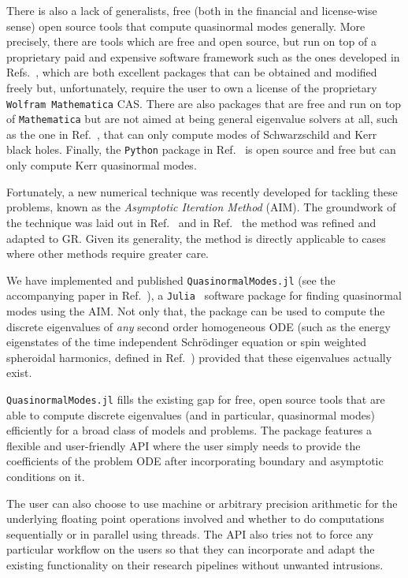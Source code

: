 There is also a lack of generalists, free (both in the financial and license-wise sense) open source tools that compute quasinormal modes generally. More precisely, there are tools which are free and open source, but run on top of a proprietary paid and expensive software framework such as the ones developed in Refs.~\cite{qnmspectral,spectralbp}, which are both excellent packages that can be obtained and modified freely but, unfortunately, require the user to own a license of the proprietary \texttt{Wolfram Mathematica} CAS. There are also packages that are free and run on top of \texttt{Mathematica} but are not aimed at being general eigenvalue solvers at all, such as the one in Ref.~\cite{bhpt_quasinormalmodes}, that can only compute modes of Schwarzschild and Kerr black holes. Finally, the \texttt{Python} package in Ref.~\cite{bhpt_qnm} is open source and free but can only compute Kerr quasinormal modes.

Fortunately, a new numerical technique was recently developed for tackling these problems, known as the \emph{Asymptotic Iteration Method} (AIM). The groundwork of the technique was laid out in Ref.~\cite{aim_original} and in Ref.~\cite{aim_improved} the method was refined and adapted to GR. Given its generality, the method is directly applicable to cases where other methods require greater care.

We have implemented and published \texttt{QuasinormalModes.jl} (see the accompanying paper in Ref.~\cite{Sanches2022}), a \texttt{Julia}~\cite{Bezanson2017} software package for finding quasinormal modes using the AIM. Not only that, the package can be used to compute the discrete eigenvalues of \emph{any} second order homogeneous ODE (such as the energy eigenstates of the time independent Schrödinger equation or spin weighted spheroidal harmonics, defined in Ref.~\cite{PhysRevD.73.024013}) provided that these eigenvalues actually exist.

\texttt{QuasinormalModes.jl} fills the existing gap for free, open source tools that are able to compute discrete eigenvalues (and in particular, quasinormal modes) efficiently for a broad class of models and problems. The package features a flexible and user-friendly API where the user simply needs to provide the coefficients of the problem ODE after incorporating boundary and asymptotic conditions on it.

The user can also choose to use machine or arbitrary precision arithmetic for the underlying floating point operations involved and whether to do computations sequentially or in parallel using threads. The API also tries not to force any particular workflow on the users so that they can incorporate and adapt the existing functionality on their research pipelines without unwanted intrusions.

